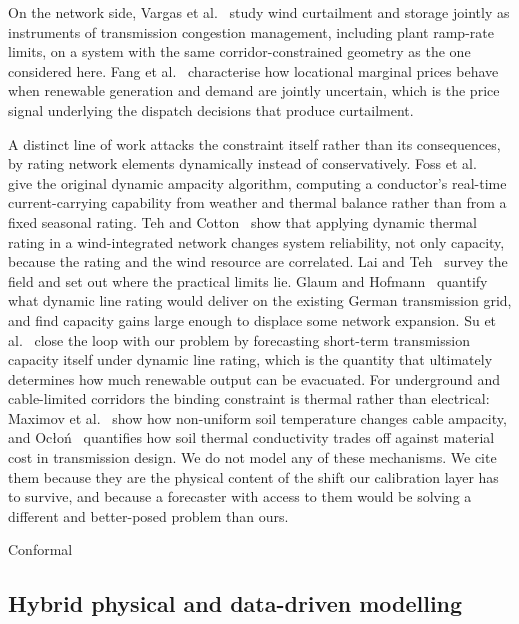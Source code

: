 \documentclass[preprint,3p,times]{elsarticle}
\providecommand{\DIFaddtex}[1]{{\protect\color{blue} \sf #1}} %
\providecommand{\DIFdeltex}[1]{{\protect\color{red} \scriptsize #1}} %
\providecommand{\DIFaddbegin}{} %
\providecommand{\DIFaddend}{} %
\providecommand{\DIFdelbegin}{} %
\providecommand{\DIFdelend}{} %
\providecommand{\DIFadd}[1]{\texorpdfstring{\DIFaddtex{#1}}{#1}} %
\providecommand{\DIFdel}[1]{\texorpdfstring{\DIFdeltex{#1}}{}} %
\begin{document}
\DIFadd{On the network side, Vargas et al.~\cite{vargas2015} study wind curtailment and storage jointly as instruments of transmission congestion management, including plant ramp-rate limits, on a system with the same corridor-constrained geometry as the one considered here. Fang et al.~\cite{fang2021} characterise how locational marginal prices behave when renewable generation and demand are jointly uncertain, which is the price signal underlying the dispatch decisions that produce curtailment.
}

\DIFadd{A distinct line of work attacks the constraint itself rather than its consequences, by rating network elements dynamically instead of conservatively. Foss et al.~\cite{foss1983} give the original dynamic ampacity algorithm, computing a conductor's real-time current-carrying capability from weather and thermal balance rather than from a fixed seasonal rating. Teh and Cotton~\cite{teh2016} show that applying dynamic thermal rating in a wind-integrated network changes system reliability, not only capacity, because the rating and the wind resource are correlated. Lai and Teh~\cite{lai2022} survey the field and set out where the practical limits lie. Glaum and Hofmann~\cite{glaum2023} quantify what dynamic line rating would deliver on the existing German transmission grid, and find capacity gains large enough to displace some network expansion. Su et al.~\cite{su2025} close the loop with our problem by forecasting short-term transmission capacity itself under dynamic line rating, which is the quantity that ultimately determines how much renewable output can be evacuated. For underground and cable-limited corridors the binding constraint is thermal rather than electrical: Maximov et al.~\cite{maximov2016} show how non-uniform soil temperature changes cable ampacity, and Ocło\'n~\cite{oclon2021} quantifies how soil thermal conductivity trades off against material cost in transmission design. We do not model any of these mechanisms. We cite them because they are the physical content of the shift our calibration layer has to survive, and because a forecaster with access to them would be solving a different and better-posed problem than ours}\DIFaddend .

\DIFdelbegin \DIFdel{Conformal }\DIFdelend \DIFaddbegin \subsection{Hybrid physical and data-driven modelling}
\end{document}
